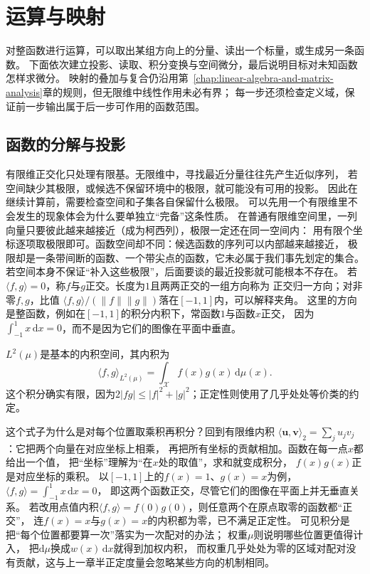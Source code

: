 \section{运算与映射}
\label{sec:functional-operators}

对整函数进行运算，可以取出某组方向上的分量、读出一个标量，或生成另一条函数。
下面依次建立投影、读取、积分变换与空间微分，最后说明目标对未知函数怎样求微分。
映射的叠加与复合仍沿用第~\ref{chap:linear-algebra-and-matrix-analysis}章的规则，但无限维中线性作用未必有界；
每一步还须检查定义域，保证前一步输出属于后一步可作用的函数范围。

\subsection{函数的分解与投影}
\label{sec:functional-decomposition-projection}
\label{sec:functional-orthogonal-expansions-projections}

\label{sec:functional-projection-approximation}

有限维正交化只处理有限基。无限维中，寻找最近分量往往先产生近似序列，
若空间缺少其极限，或候选不保留环境中的极限，就可能没有可用的投影。
因此在继续计算前，需要检查空间和子集各自保留什么极限。
可以先用一个有限维里不会发生的现象体会为什么要单独立“完备”这条性质。
在普通有限维空间里，一列向量只要彼此越来越接近（成为柯西列），极限一定还在同一空间内：
用有限个坐标逐项取极限即可。函数空间却不同：候选函数的序列可以内部越来越接近，
极限却是一条带间断的函数、一个带尖点的函数，它未必属于我们事先划定的集合。
若空间本身不保证“补入这些极限”，后面要谈的最近投影就可能根本不存在。
若$\langle f,g\rangle=0$，称$f$与$g$正交。长度为$1$且两两正交的一组方向称为
正交归一方向；对非零$f,g$，比值
$\langle f,g\rangle/(\lVert f\rVert\lVert g\rVert)$落在$[-1,1]$内，可以解释夹角。
这里的方向是整函数，例如在$[-1,1]$的积分内积下，常函数$1$与函数$x$正交，
因为$\int_{-1}^1x\,\mathrm dx=0$，而不是因为它们的图像在平面中垂直。

$L^2(\mu)$是基本的内积空间，其内积为
\[
  \langle f,g\rangle_{L^2(\mu)}
  =\int_{\mathcal{X}}f(x)g(x)\,\mathrm{d}\mu(x).
\]
这个积分确实有限，因为$2|fg|\leq |f|^2+|g|^2$；正定性则使用了几乎处处等价类的约定。

这个式子为什么是对每个位置取乘积再积分？回到有限维内积
$\langle\bm u,\bm v\rangle_2=\sum_j u_jv_j$：它把两个向量在对应坐标上相乘，
再把所有坐标的贡献相加。函数在每一点$x$都给出一个值，
把“坐标”理解为“在$x$处的取值”，求和就变成积分，
$f(x)g(x)$正是对应坐标的乘积。
以$[-1,1]$上的$f(x)=1$、$g(x)=x$为例，
$\langle f,g\rangle=\int_{-1}^{1}x\,\mathrm dx=0$，
即这两个函数正交，尽管它们的图像在平面上并无垂直关系。
若改用点值内积$\langle f,g\rangle=f(0)g(0)$，则任意两个在原点取零的函数都“正交”，
连$f(x)=x$与$g(x)=x$的内积都为零，已不满足正定性。
可见积分是把“每个位置都要算一次”落实为一次配对的办法；
权重$\mu$则说明哪些位置更值得计入，
把$\mathrm d\mu$换成$w(x)\,\mathrm dx$就得到加权内积，
而权重几乎处处为零的区域对配对没有贡献，这与上一章半正定度量会忽略某些方向的机制相同。

